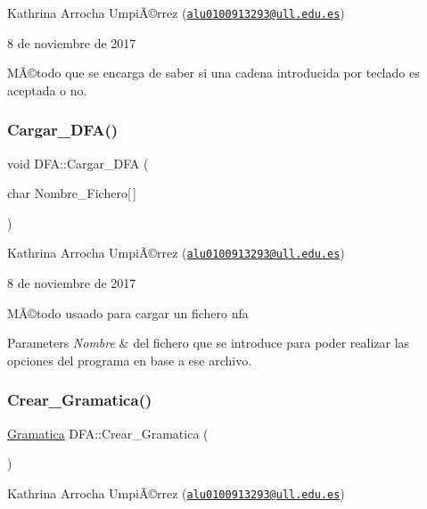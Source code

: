 Kathrina Arrocha UmpiÃ©rrez (\href{mailto:alu0100913293@ull.edu.es}{\tt alu0100913293@ull.\+edu.\+es})

8 de noviembre de 2017

MÃ©todo que se encarga de saber si una cadena introducida por teclado es aceptada o no. \mbox{\label{class_d_f_a_a0e252de663175ef960d025d8b78cbc6d}} 
\subsubsection{\texorpdfstring{Cargar\+\_\+\+D\+F\+A()}{Cargar\_DFA()}}
{\footnotesize\ttfamily void D\+F\+A\+::\+Cargar\+\_\+\+D\+FA (\begin{DoxyParamCaption}\item[{char}]{Nombre\+\_\+\+Fichero\mbox{[}$\,$\mbox{]} }\end{DoxyParamCaption})}

Kathrina Arrocha UmpiÃ©rrez (\href{mailto:alu0100913293@ull.edu.es}{\tt alu0100913293@ull.\+edu.\+es})

8 de noviembre de 2017

MÃ©todo usaado para cargar un fichero nfa


\begin{DoxyParams}{Parameters}
{\em Nombre} & del fichero que se introduce para poder realizar las opciones del programa en base a ese archivo. \\
\hline
\end{DoxyParams}
\mbox{\label{class_d_f_a_a2ea435af1720ebc8b478cb15200bd825}} 
\subsubsection{\texorpdfstring{Crear\+\_\+\+Gramatica()}{Crear\_Gramatica()}}
{\footnotesize\ttfamily \hyperlink{class_gramatica}{Gramatica} D\+F\+A\+::\+Crear\+\_\+\+Gramatica (\begin{DoxyParamCaption}{ }\end{DoxyParamCaption})}

Kathrina Arrocha UmpiÃ©rrez (\href{mailto:alu0100913293@ull.edu.es}{\tt alu0100913293@ull.\+edu.\+es})

